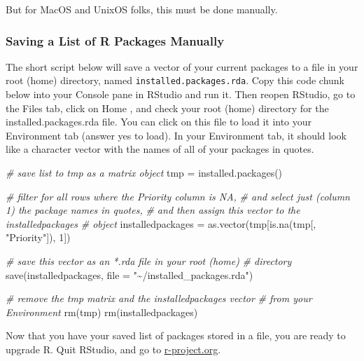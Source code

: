 \documentclass[
]{book}
\newenvironment{Shaded}{\begin{snugshade}}{\end{snugshade}}
\newcommand{\AttributeTok}[1]{\textcolor[rgb]{0.77,0.63,0.00}{#1}}
\newcommand{\CommentTok}[1]{\textcolor[rgb]{0.56,0.35,0.01}{\textit{#1}}}
\newcommand{\DecValTok}[1]{\textcolor[rgb]{0.00,0.00,0.81}{#1}}
\newcommand{\FunctionTok}[1]{\textcolor[rgb]{0.00,0.00,0.00}{#1}}
\newcommand{\NormalTok}[1]{#1}
\newcommand{\OtherTok}[1]{\textcolor[rgb]{0.56,0.35,0.01}{#1}}
\newcommand{\StringTok}[1]{\textcolor[rgb]{0.31,0.60,0.02}{#1}}
\begin{document}
But for MacOS and UnixOS folks, this must be done manually.

\hypertarget{saving-a-list-of-r-packages-manually}{%
\subsubsection{Saving a List of R Packages Manually}\label{saving-a-list-of-r-packages-manually}}

The short script below will save a vector of your current packages to a file in your root (home) directory, named \texttt{installed.packages.rda}. Copy this code chunk below into your Console pane in RStudio and run it. Then reopen RStudio, go to the Files tab, click on Home , and check your root (home) directory for the installed.packages.rda file. You can click on this file to load it into your Environment tab (answer yes to load). In your Environment tab, it should look like a character vector with the names of all of your packages in quotes.

\begin{Shaded}
\begin{Highlighting}[]
\CommentTok{\# save list to tmp as a matrix object}
\NormalTok{tmp }\OtherTok{=} \FunctionTok{installed.packages}\NormalTok{()}

\CommentTok{\# filter for all rows where the \textquotesingle{}Priority\textquotesingle{} column is NA,}
\CommentTok{\# and select just (column 1) the package names in quotes,}
\CommentTok{\# and then assign this vector to the installedpackages}
\CommentTok{\# object}
\NormalTok{installedpackages }\OtherTok{=} \FunctionTok{as.vector}\NormalTok{(tmp[}\FunctionTok{is.na}\NormalTok{(tmp[, }\StringTok{"Priority"}\NormalTok{]), }\DecValTok{1}\NormalTok{])}

\CommentTok{\# save this vector as an *.rda file in your root (home)}
\CommentTok{\# directory}
\FunctionTok{save}\NormalTok{(installedpackages, }\AttributeTok{file =} \StringTok{"\textasciitilde{}/installed\_packages.rda"}\NormalTok{)}

\CommentTok{\# remove the tmp matrix and the installedpackages vector}
\CommentTok{\# from your Environment}
\FunctionTok{rm}\NormalTok{(tmp)}
\FunctionTok{rm}\NormalTok{(installedpackages)}
\end{Highlighting}
\end{Shaded}

Now that you have your saved list of packages stored in a file, you are ready to upgrade R. Quit RStudio, and go to \href{https://www.r-project.org/}{r-project.org}.
\end{document}
